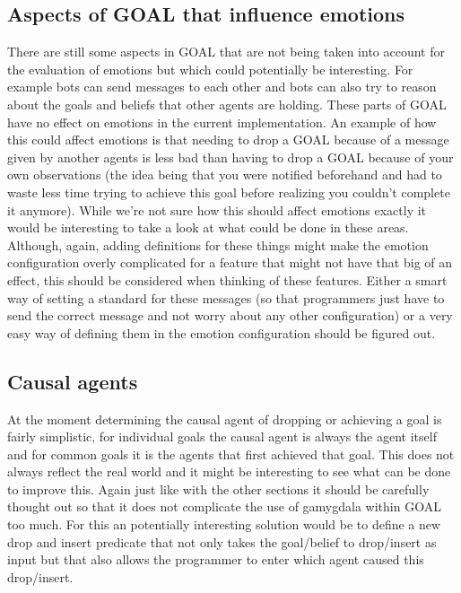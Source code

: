 \documentclass[11pt]{article}
\begin{document}
\subsection{Aspects of GOAL that influence emotions}
There are still some aspects in GOAL that are not being taken into account for the evaluation of emotions but which could potentially be interesting. For example bots can send messages to each other and bots can also try to reason about the goals and beliefs that other agents are holding. These parts of GOAL have no effect on emotions in the current implementation. An example of how this could affect emotions is that needing to drop a GOAL because of a message given by another agents is less bad than having to drop a GOAL because of your own observations (the idea being that you were notified beforehand and had to waste less time trying to achieve this goal before realizing you couldn't complete it anymore). While we're not sure how this should affect emotions exactly it would be interesting to take a look at what could be done in these areas. Although, again, adding definitions for these things might make the emotion configuration overly complicated for a feature that might not have that big of an effect, this should be considered when thinking of these features. Either a smart way of setting a standard for these messages (so that programmers just have to send the correct message and not worry about any other configuration) or a very easy way of defining them in the emotion configuration should be figured out.

\subsection{Causal agents}
At the moment determining the causal agent of dropping or achieving a goal is fairly simplistic, for individual goals the causal agent is always the agent itself and for common goals it is the agents that first achieved that goal. This does not always reflect the real world and it might be interesting to see what can be done to improve this. Again just like with the other sections it should be carefully thought out so that it does not complicate the use of gamygdala within GOAL too much. For this an potentially interesting solution would be to define a new drop and insert predicate that not only takes the goal/belief to drop/insert as input but that also allows the programmer to enter which agent caused this drop/insert.
\end{document}
